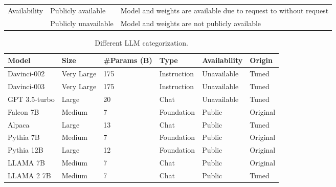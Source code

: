 \documentclass[conference]{IEEEtran}
\begin{document}
\begin{table*}[ht]
\begin{tabular}{lll}
\multicolumn{1}{|l|}{\multirow{2}{*}{Availability}} & \multicolumn{1}{l|}{Publicly available}    & \multicolumn{1}{l|}{Model and weights are available due to request to without request}            \\ \cline{2-3}  
\multicolumn{1}{|l|}{}                      & \multicolumn{1}{l|}{Publicly unavailable}    & \multicolumn{1}{l|}{Model and weights are not publicly available}            \\
\hline
\end{tabular}
\end{table*}


\begin{table*}[!ht]
    \centering
    \caption{Different LLM categorization.}
    \label{tab:categorized}
    \begin{tabular}{|l|l|l|l|l|l|}
    \hline
        Model & Size & \#Params (B)& Type & Availability & Origin \\ \hline
        Davinci-002 & \cellcolor{red!25}Very Large & 175 & \cellcolor{blue!25}Instruction &  \cellcolor{yellow!25}Unavailable & \cellcolor{pink!25}Tuned \\ \hline
        Davinci-003 & \cellcolor{red!25}Very Large & 175 &\cellcolor{blue!25}Instruction &  \cellcolor{yellow!25}Unavailable & \cellcolor{pink!25}Tuned \\ \hline
        GPT 3.5-turbo & \cellcolor{yellow!25}Large & 20 &\cellcolor{purple!25}Chat &  \cellcolor{yellow!25}Unavailable & \cellcolor{pink!25}Tuned \\ \hline
        Falcon 7B & \cellcolor{green!25}Medium & 7 &\cellcolor{gray!25}Foundation & \cellcolor{green!25}Public & \cellcolor{teal!25}Original \\ \hline
        Alpaca & \cellcolor{yellow!25}Large & 13 &\cellcolor{purple!25}Chat & \cellcolor{green!25}Public & \cellcolor{pink!25}Tuned \\ \hline
        Pythia 7B & \cellcolor{green!25}Medium & 7 & \cellcolor{gray!25}Foundation & \cellcolor{green!25}Public & \cellcolor{teal!25}Original \\ \hline
        Pythia 12B & \cellcolor{yellow!25}Large & 12 &\cellcolor{gray!25}Foundation & \cellcolor{green!25}Public & \cellcolor{teal!25}Original \\ \hline
        LLAMA 7B & \cellcolor{green!25}Medium & 7 &\cellcolor{purple!25}Chat & \cellcolor{green!25}Public & \cellcolor{teal!25}Original \\ \hline
        LLAMA 2 7B & \cellcolor{green!25}Medium & 7 &\cellcolor{purple!25}Chat & \cellcolor{green!25}Public & \cellcolor{pink!25}Tuned \\ \hline

\end{tabular}
\end{table*}
\end{document}

